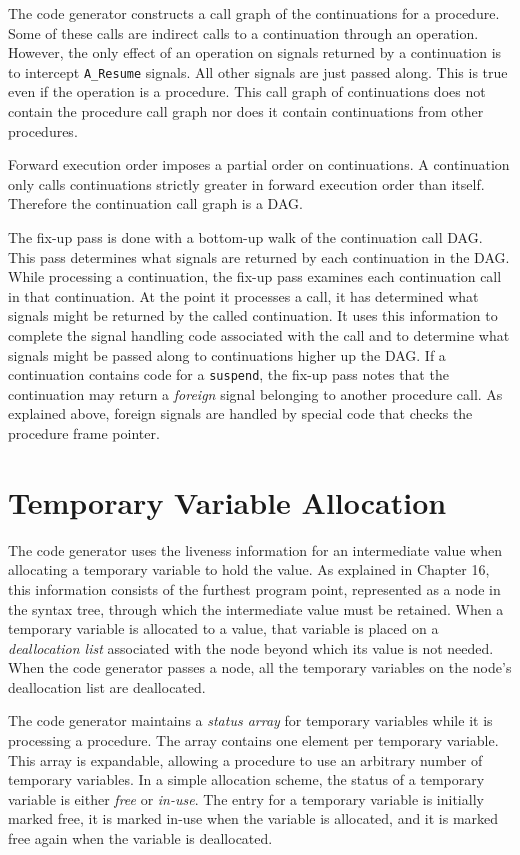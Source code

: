 The code generator constructs a call graph of the continuations for a
procedure. Some of these calls are indirect calls to a continuation
through an operation. However, the only effect of an operation on
signals returned by a continuation is to intercept \texttt{A\_Resume}
signals. All other signals are just passed along. This is true even if
the operation is a procedure. This call graph of continuations does
not contain the procedure call graph nor does it contain continuations
from other procedures.

Forward execution order imposes a partial order on continuations. A
continuation only calls continuations strictly greater in forward
execution order than itself. Therefore the continuation call graph is
a DAG.

The fix-up pass is done with a bottom-up walk of the continuation call
DAG. This pass determines what signals are returned by each
continuation in the DAG. While processing a continuation, the fix-up
pass examines each continuation call in that continuation. At the
point it processes a call, it has determined what signals might be
returned by the called continuation. It uses this information to
complete the signal handling code associated with the call and to
determine what signals might be passed along to continuations higher
up the DAG. If a continuation contains code for a \texttt{suspend}, the fix-up
pass notes that the continuation may return a \textit{foreign} signal
belonging to another procedure call. As explained above, foreign
signals are handled by special code that checks the procedure frame
pointer.


\section{Temporary Variable Allocation}

The code generator uses the liveness information for an intermediate
value when allocating a temporary variable to hold the value. As
explained in Chapter 16, this information consists of the furthest
program point, represented as a node in the syntax tree, through which
the intermediate value must be retained. When a temporary variable is
allocated to a value, that variable is placed on a
\textit{deallocation list} associated with the node beyond which its
value is not needed. When the code generator passes a node, all the
temporary variables on the node's deallocation list are deallocated.

The code generator maintains a \textit{status array} for temporary
variables while it is processing a procedure. The array contains one
element per temporary variable. This array is expandable, allowing a
procedure to use an arbitrary number of temporary variables. In a
simple allocation scheme, the status of a temporary variable is either
\textit{free} or \textit{in-use}. The entry for a temporary variable
is initially marked free, it is marked in-use when the variable is
allocated, and it is marked free again when the variable is
deallocated.

